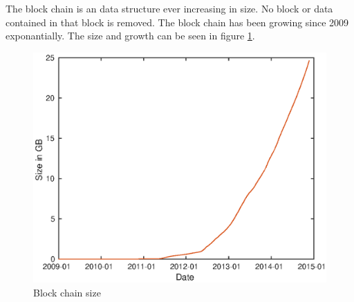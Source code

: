 The block chain is an data structure ever increasing in size.
No block or data contained in that block is removed.
The block chain has been growing since 2009 exponantially.
The size and growth can be seen in figure \ref{fig:bc-size}\cite{Blockchain.info-bcs}.

\begin{figure}[H]
        \centerline{\includegraphics[scale=0.6]{problemDescription/figs/bcs/blockchainsize.eps}}
        \caption{Block chain size}
	\label{fig:bc-size}
\end{figure}
